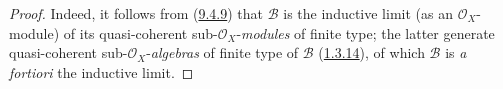 \begin{proof}
Indeed, it follows from (\hyperref[I.9.4.9]{9.4.9}) that $\mathscr{B}$
is the inductive limit (as an $\mathscr{O}_X$-module) of its quasi-coherent
sub-$\mathscr{O}_X$-\emph{modules} of finite type; the latter generate
quasi-coherent sub-$\mathscr{O}_X$-\emph{algebras} of finite type of $\mathscr{B}$
(\hyperref[I.1.3.14]{1.3.14}), of which $\mathscr{B}$ is \emph{a
fortiori} the inductive limit.
\end{proof}
